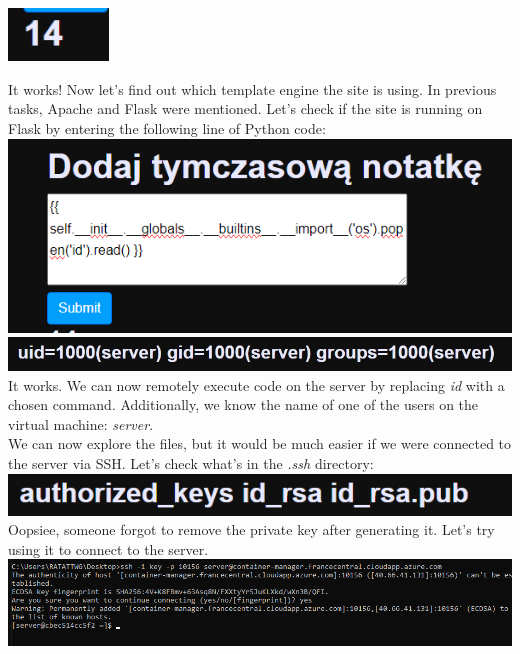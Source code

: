 \documentclass{article}
\begin{document}
\begin{center}
    \includegraphics[width=0.2\textwidth]{"image84.png"}
\end{center}
It works! Now let’s find out which template engine the site is using. In previous tasks, Apache and Flask were mentioned. Let’s check if the site is running on Flask by entering the following line of Python code:
\vspace{3mm} \\
\includegraphics[width=\textwidth]{"image85.png"}
\vspace{3mm}
\includegraphics[width=\textwidth]{"image86.jpeg"}
It works. We can now remotely execute code on the server by replacing \textit{id} with a chosen command. Additionally, we know the name of one of the users on the virtual machine: \textit{server}.
\vspace{3mm} \\
We can now explore the files, but it would be much easier if we were connected to the server via SSH. Let’s check what’s in the \textit{.ssh} directory: \vspace{3mm} \\
\includegraphics[width=\textwidth]{"image87.png"}
Oopsiee, someone forgot to remove the private key after generating it. Let’s try using it to connect to the server. \\
\includegraphics[width=\textwidth]{"image88.png"}
\end{document}
